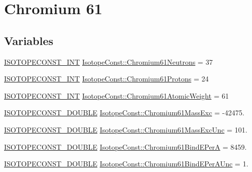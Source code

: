 \hypertarget{group___isotope_const-_chromium-_cr61}{}\section{Chromium 61}
\label{group___isotope_const-_chromium-_cr61}
\subsection*{Variables}
\begin{DoxyCompactItemize}
\item 
\mbox{\hyperlink{group___isotope_const-_macros_ga5f18360b3e99483a35c32d789e62621c}{I\+S\+O\+T\+O\+P\+E\+C\+O\+N\+S\+T\+\_\+\+I\+NT}} \mbox{\hyperlink{group___isotope_const-_chromium-_cr61_ga94ee9378a477d8a99e1821033ac2334f}{Isotope\+Const\+::\+Chromium61\+Neutrons}} = 37
\item 
\mbox{\hyperlink{group___isotope_const-_macros_ga5f18360b3e99483a35c32d789e62621c}{I\+S\+O\+T\+O\+P\+E\+C\+O\+N\+S\+T\+\_\+\+I\+NT}} \mbox{\hyperlink{group___isotope_const-_chromium-_cr61_ga5e3f298826a9eddc371230cdcef7cc95}{Isotope\+Const\+::\+Chromium61\+Protons}} = 24
\item 
\mbox{\hyperlink{group___isotope_const-_macros_ga5f18360b3e99483a35c32d789e62621c}{I\+S\+O\+T\+O\+P\+E\+C\+O\+N\+S\+T\+\_\+\+I\+NT}} \mbox{\hyperlink{group___isotope_const-_chromium-_cr61_gaa902fa1961b8aa38f1dc0eba24b76480}{Isotope\+Const\+::\+Chromium61\+Atomic\+Weight}} = 61
\item 
\mbox{\hyperlink{group___isotope_const-_macros_ga8f45a7272ce02c0b4c65c44636ed719a}{I\+S\+O\+T\+O\+P\+E\+C\+O\+N\+S\+T\+\_\+\+D\+O\+U\+B\+LE}} \mbox{\hyperlink{group___isotope_const-_chromium-_cr61_ga76b282dd78bdde02ee13f96b88104790}{Isotope\+Const\+::\+Chromium61\+Mass\+Exc}} = -\/42475.
\item 
\mbox{\hyperlink{group___isotope_const-_macros_ga8f45a7272ce02c0b4c65c44636ed719a}{I\+S\+O\+T\+O\+P\+E\+C\+O\+N\+S\+T\+\_\+\+D\+O\+U\+B\+LE}} \mbox{\hyperlink{group___isotope_const-_chromium-_cr61_gab47aefca77deff0704347ce34e868c97}{Isotope\+Const\+::\+Chromium61\+Mass\+Exc\+Unc}} = 101.
\item 
\mbox{\hyperlink{group___isotope_const-_macros_ga8f45a7272ce02c0b4c65c44636ed719a}{I\+S\+O\+T\+O\+P\+E\+C\+O\+N\+S\+T\+\_\+\+D\+O\+U\+B\+LE}} \mbox{\hyperlink{group___isotope_const-_chromium-_cr61_ga3b0d38b559dd47cdd843cddf15f0d3b1}{Isotope\+Const\+::\+Chromium61\+Bind\+E\+PerA}} = 8459.
\item 
\mbox{\hyperlink{group___isotope_const-_macros_ga8f45a7272ce02c0b4c65c44636ed719a}{I\+S\+O\+T\+O\+P\+E\+C\+O\+N\+S\+T\+\_\+\+D\+O\+U\+B\+LE}} \mbox{\hyperlink{group___isotope_const-_chromium-_cr61_ga5ea738f29408414254761391e37a7da7}{Isotope\+Const\+::\+Chromium61\+Bind\+E\+Per\+A\+Unc}} = 1.

\end{DoxyCompactItemize}
